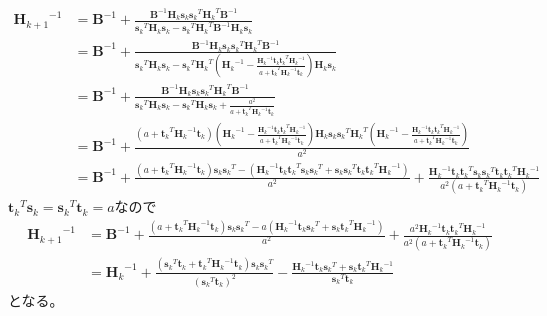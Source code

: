 \documentclass[10pt,a4paper]{ltjsarticle}       %
\begin{document}
    \begin{align}
    {\bm{H}_{k+1}}^{-1} &= {\bm{B}}^{-1} + \frac{
      \bm{B}^{-1}\bm{H}_k \bm{s}_k{\bm{s}_k}^T{\bm{H}_k}^T\bm{B}^{-1}
    }{
      {\bm{s}_k}^T\bm{H}_k\bm{s}_k - {\bm{s}_k}^T{\bm{H}_k}^T\bm{B}^{-1}\bm{H}_k\bm{s}_k
    } \\
    &= \bm{B}^{-1} + \frac{
      \bm{B}^{-1}\bm{H}_k \bm{s}_k{\bm{s}_k}^T{\bm{H}_k}^T\bm{B}^{-1}
    }{
      {\bm{s}_k}^T\bm{H}_k\bm{s}_k - {\bm{s}_k}^T{\bm{H}_k}^T\left(  {\bm{H}_k}^{-1} - \frac{
      {\bm{H}_k}^{-1}\bm{t}_k{\bm{t}_k}^T{\bm{H}_k}^{-1}
    }{
      a + {\bm{t}_k}^T{\bm{H}_k}^{-1}\bm{t}_k
    } \right)\bm{H}_k\bm{s}_k
    } \\
    &= \bm{B}^{-1} + \frac{
      \bm{B}^{-1}\bm{H}_k \bm{s}_k{\bm{s}_k}^T{\bm{H}_k}^T\bm{B}^{-1}
    }{
      {\bm{s}_k}^T\bm{H}_k\bm{s}_k - {\bm{s}_k}^T{\bm{H}_k}\bm{s}_k + \frac{
      a^2
    }{
      a + {\bm{t}_k}^T{\bm{H}_k}^{-1}\bm{t}_k
    } 
    } \\
    &= \bm{B}^{-1} + \frac{
      \left( a + {\bm{t}_k}^T{\bm{H}_k}^{-1}\bm{t}_k \right) \left( {\bm{H}_k}^{-1} - \frac{
      {\bm{H}_k}^{-1}\bm{t}_k{\bm{t}_k}^T{\bm{H}_k}^{-1}
    }{
      a + {\bm{t}_k}^T{\bm{H}_k}^{-1}\bm{t}_k
    }\right)\bm{H}_k\bm{s}_k{\bm{s}_k}^T{\bm{H}_k}^T \left( {\bm{H}_k}^{-1} - \frac{
      {\bm{H}_k}^{-1}\bm{t}_k{\bm{t}_k}^T{\bm{H}_k}^{-1}
    }{
      a + {\bm{t}_k}^T{\bm{H}_k}^{-1}\bm{t}_k
    } \right)
    }{
      a^2
    } \\
    &= \bm{B}^{-1} + \frac{
      \left( a + {\bm{t}_k}^T{\bm{H}_k}^{-1}\bm{t}_k \right) \bm{s}_k{\bm{s}_k}^T - \left(  {\bm{H}_k}^{-1}\bm{t}_k{\bm{t}_k}^{T}\bm{s}_k{\bm{s}_k}^{T} + \bm{s}_k{\bm{s}_k}^T\bm{t}_k{\bm{t}_k}^T{\bm{H}_k}^{-1} \right)
    }{
      a^2
    } + \frac{
      {\bm{H}_k}^{-1}\bm{t}_k{\bm{t}_k}^T \bm{s}_k{\bm{s}_k}^T \bm{t}_k{\bm{t}_k}^T{\bm{H}_k}^{-1}
    }{
      a^2\left( a + {\bm{t}_k}^T{\bm{H}_k}^{-1}\bm{t}_k \right)
    }
    \end{align}
    ${\bm{t}_k}^T\bm{s}_k = {\bm{s}_k}^T\bm{t}_k = a$なので
    \begin{align}
    {\bm{H}_{k+1}}^{-1} &= \bm{B}^{-1} + \frac{
      \left( a + {\bm{t}_k}^T{\bm{H}_k}^{-1}\bm{t}_k \right) \bm{s}_k{\bm{s}_k}^T - a\left(  {\bm{H}_k}^{-1}\bm{t}_k{\bm{s}_k}^{T} + \bm{s}_k{\bm{t}_k}^T{\bm{H}_k}^{-1} \right)
    }{
      a^2
    } + \frac{
      a^2{\bm{H}_k}^{-1}\bm{t}_k{\bm{t}_k}^T{\bm{H}_k}^{-1}
    }{
      a^2\left( a + {\bm{t}_k}^T{\bm{H}_k}^{-1}\bm{t}_k \right)
    } \\
    &= {\bm{H}_k}^{-1} + \frac{
      \left( {\bm{s}_k}^T\bm{t}_k + {\bm{t}_k}^T{\bm{H}_k}^{-1}\bm{t}_k \right)\bm{s}_k{\bm{s}_k}^T
    }{
      \left( {\bm{s}_k}^T\bm{t}_k \right)^2
    } - \frac{
      {\bm{H}_k}^{-1}\bm{t}_k{\bm{s}_k}^{T} + \bm{s}_k{\bm{t}_k}^T{\bm{H}_k}^{-1}
    }{
      {\bm{s}_k}^T\bm{t}_k
    }
    \end{align}
    となる。
\end{document}
